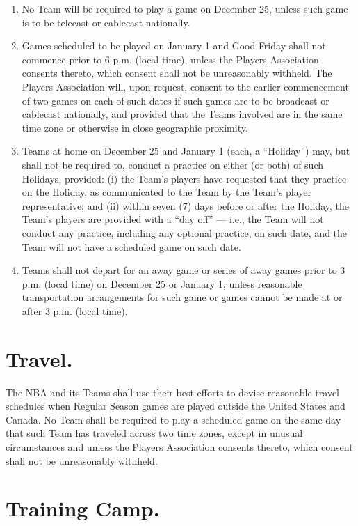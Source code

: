 \documentclass[
]{book}
\providecommand{\tightlist}{%
  \setlength{\itemsep}{0pt}\setlength{\parskip}{0pt}}
\begin{document}
\begin{enumerate}
\def\labelenumi{(\alph{enumi})}
\tightlist
\item
  No Team will be required to play a game on December 25, unless such game is to be telecast or cablecast nationally.
\item
  Games scheduled to be played on January 1 and Good Friday shall not commence prior to 6 p.m. (local time), unless the Players Association consents thereto, which consent shall not be unreasonably withheld. The Players Association will, upon request, consent to the earlier commencement of two games on each of such dates if such games are to be broadcast or cablecast nationally, and provided that the Teams involved are in the same time zone or otherwise in close geographic proximity.
\item
  Teams at home on December 25 and January 1 (each, a ``Holiday'') may, but shall not be required to, conduct a practice on either (or both) of such Holidays, provided: (i) the Team's players have requested that they practice on the Holiday, as communicated to the Team by the Team's player representative; and (ii) within seven (7) days before or after the Holiday, the Team's players are provided with a ``day off'' --- i.e., the Team will not conduct any practice, including any optional practice, on such date, and the Team will not have a scheduled game on such date.
\item
  Teams shall not depart for an away game or series of away games prior to 3 p.m. (local time) on December 25 or January 1, unless reasonable transportation arrangements for such game or games cannot be made at or after 3 p.m. (local time).
\end{enumerate}

\hypertarget{travel.}{%
\section{Travel.}\label{travel.}}

The NBA and its Teams shall use their best efforts to devise reasonable travel schedules when Regular Season games are played outside the United States and Canada. No Team shall be required to play a scheduled game on the same day that such Team has traveled across two time zones, except in unusual circumstances and unless the Players Association consents thereto, which consent shall not be unreasonably withheld.

\hypertarget{training-camp.}{%
\section{Training Camp.}\label{training-camp.}}
\end{document}
